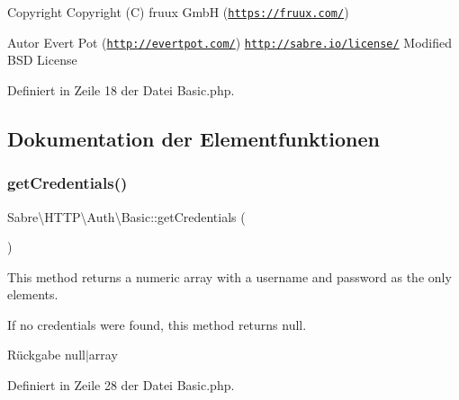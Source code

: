\begin{DoxyCopyright}{Copyright}
Copyright (C) fruux GmbH (\href{https://fruux.com/}{\tt https\+://fruux.\+com/}) 
\end{DoxyCopyright}
\begin{DoxyAuthor}{Autor}
Evert Pot (\href{http://evertpot.com/}{\tt http\+://evertpot.\+com/})  \href{http://sabre.io/license/}{\tt http\+://sabre.\+io/license/} Modified B\+SD License 
\end{DoxyAuthor}


Definiert in Zeile 18 der Datei Basic.\+php.



\subsection{Dokumentation der Elementfunktionen}
\mbox{\label{class_sabre_1_1_h_t_t_p_1_1_auth_1_1_basic_ab52f197bdfaa2154e80995923fdadcd3}} 
\subsubsection{\texorpdfstring{get\+Credentials()}{getCredentials()}}
{\footnotesize\ttfamily Sabre\textbackslash{}\+H\+T\+T\+P\textbackslash{}\+Auth\textbackslash{}\+Basic\+::get\+Credentials (\begin{DoxyParamCaption}{ }\end{DoxyParamCaption})}

This method returns a numeric array with a username and password as the only elements.

If no credentials were found, this method returns null.

\begin{DoxyReturn}{Rückgabe}
null$\vert$array 
\end{DoxyReturn}


Definiert in Zeile 28 der Datei Basic.\+php.

\mbox{\label{class_sabre_1_1_h_t_t_p_1_1_auth_1_1_basic_a89af6546622194a90176057eaff6d4c8}} 
